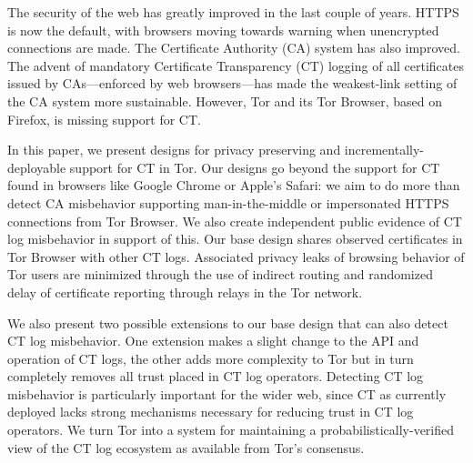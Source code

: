The security of the web has greatly improved in the last couple of years. HTTPS
is now the default, with browsers moving towards warning when unencrypted
connections are made. The Certificate Authority (CA) system has also improved.
The advent of mandatory Certificate Transparency (CT) logging of all
certificates issued by CAs---enforced by web browsers---has made the
weakest-link setting of the CA system more sustainable. However, Tor and its Tor
Browser, based on Firefox, is missing support for CT.

In this paper, we present designs for privacy preserving and
incrementally-deployable support for CT in Tor. Our designs go beyond
the support for CT found in browsers like Google Chrome or Apple's
Safari: we aim to do more than detect CA misbehavior supporting
man-in-the-middle or impersonated HTTPS connections from Tor Browser.
We also create independent public evidence of CT log misbehavior in
support of this. Our base design shares observed certificates in Tor
Browser with other CT logs. Associated privacy leaks of browsing
behavior of Tor users are minimized through the use of indirect
routing and randomized delay of certificate reporting through relays
in the Tor network.

We also present two possible extensions to our base design that can also detect
CT log misbehavior. One extension makes a slight change to the API and operation
of CT logs, the other adds more complexity to Tor but in turn completely removes
all trust placed in CT log operators. Detecting CT log misbehavior is
particularly important for the wider web, since CT as currently deployed lacks
strong mechanisms necessary for reducing trust in CT log operators.
We turn Tor into a system for maintaining a probabilistically-verified view of
the CT log ecosystem as available from Tor’s consensus.
